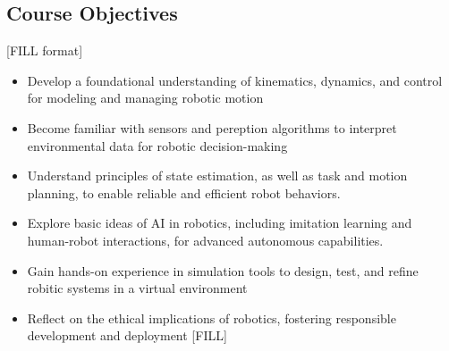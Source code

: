 \documentclass{article}
\begin{document}
\subsection*{Course Objectives} [FILL format]
\begin{itemize}
    \item Develop a foundational understanding of kinematics, dynamics, and control for modeling and managing robotic motion
    \item Become familiar with sensors and pereption algorithms to interpret environmental data for robotic decision-making
    \item Understand principles of state estimation, as well as task and motion planning, to enable reliable and efficient robot behaviors.
    \item Explore basic ideas of AI in robotics, including imitation learning and human-robot interactions, for advanced autonomous capabilities.
    \item Gain hands-on experience in simulation tools to design, test, and refine robitic systems in a virtual environment
    \item Reflect on the ethical implications of robotics, fostering responsible development and deployment [FILL]
\end{itemize}
\end{document}
